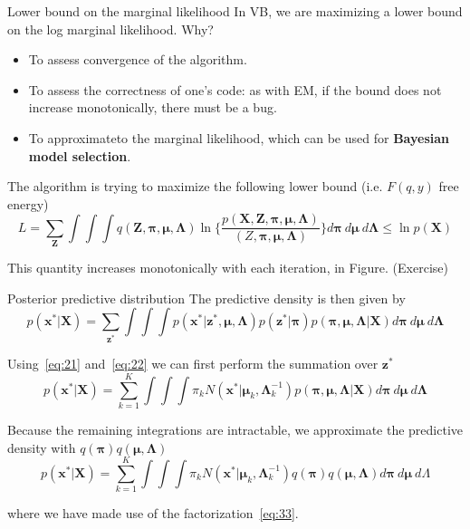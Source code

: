 \documentclass[10pt,mathserif]{beamer}
\begin{document}
\begin{frame}{Lower bound on the marginal likelihood}
In VB, we are maximizing a lower bound on the log marginal likelihood. Why?
\begin{itemize}
    \item To assess convergence of the algorithm. 
    \item To assess the correctness of one's code: as with EM, if the bound does not increase monotonically, there must be a bug.
    \item To approximateto the marginal likelihood, which can be used for \textbf{Bayesian model selection}.
\end{itemize}

The algorithm is trying to maximize the following lower bound (i.e. $F(q,y)$ free energy)
\begin{equation}
    L = \sum_{\bm{Z}}\int\int\int q(\bm{Z},\bm{\pi},\bm{\mu},\bm{\Lambda})\ln\{\frac{p(\bm{X},\bm{Z},\bm{\pi},\bm{\mu},\bm{\Lambda})}{(Z,\bm{\pi},\bm{\mu},\bm{\Lambda})}\}d\bm{\pi}\ d\bm{\mu}\ d\bm{\Lambda} \leq \ln p(\bm{X})    
\end{equation}

This quantity increases monotonically with each iteration, in Figure. (Exercise)
\end{frame}

\begin{frame}{Posterior predictive distribution}
The predictive density is then given by
\begin{equation}
    p(\bm{x}^*|\bm{X}) = \sum_{\bm{z}^*}\int\int\int p(\bm{x}^*|\bm{z}^*,\bm{\mu},\bm{\Lambda}) p(\bm{z}^*|\bm{\pi})p(\bm{\pi},\bm{\mu},\bm{\Lambda}|\bm{X})d\bm{\pi}\ d\bm{\mu}\ d\bm{\Lambda}
\end{equation}

Using~\eqref{eq:21} and~\eqref{eq:22} we can first perform the summation over $\bm{z}^*$
\begin{equation}
    p(\bm{x}^*|\bm{X}) = \sum_{k=1}^K\int\int\int \pi_k N(\bm{x}^*|\bm{\mu}_k,\bm{\Lambda}_k^{-1})p(\bm{\pi},\bm{\mu},\bm{\Lambda}|\bm{X})d\bm{\pi}\ d\bm{\mu}\ d\bm{\Lambda}
\end{equation}

Because the remaining integrations are intractable, we approximate the predictive density with  $q(\bm{\pi})q(\bm{\mu},\bm{\Lambda})$
\begin{equation}
    p(\bm{x}^*|\bm{X}) = \sum_{k=1}^K\int\int\int \pi_k N(\bm{x}^*|\bm{\mu}_k,\bm{\Lambda}_k^{-1})q(\bm{\pi})q(\bm{\mu},\bm{\Lambda})d\bm{\pi}\ d\bm{\mu}\ d\Lambda
\end{equation}

where we have made use of the factorization~\eqref{eq:33}. 
\end{frame}
\end{document}
